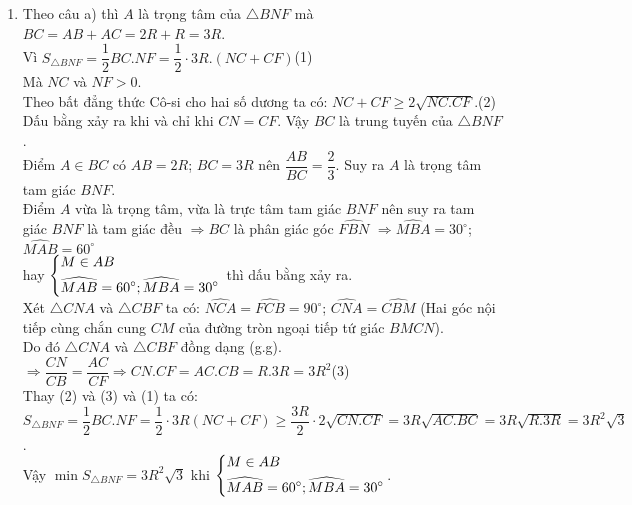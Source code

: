 \begin{vd}
{\begin{enumerate}
			\item Theo câu a) thì $A$ là trọng tâm của $\triangle BNF$ mà $BC=AB+AC=2R+R=3R$.\\
			Vì $S_{\triangle BNF}=\dfrac{1}{2}BC.NF=\dfrac{1}{2}\cdot 3R.(NC+CF)$\quad(1)\\
			Mà $NC$ và $NF>0$.\\
			Theo bất đẳng thức Cô-si cho hai số dương ta có: $NC+CF\geq 2\sqrt{NC.CF}$.\quad(2)\\
			Dấu bằng xảy ra khi và chỉ khi $CN=CF$. Vậy $BC$ là trung tuyến của $\triangle BNF$.\\
			Điểm $A\in BC$ có $AB=2R$; $BC=3R$ nên $\dfrac{AB}{BC}=\dfrac{2}{3}$. Suy ra $A$ là trọng tâm tam giác $BNF$.\\
			Điểm $A$ vừa là trọng tâm, vừa là trực tâm tam giác $BNF$ nên suy ra tam giác $BNF$ là tam giác đều
			$\Rightarrow BC$ là phân giác góc $\widehat{FBN}$ $\Rightarrow \widehat{MBA}=30^{\circ}$; $\widehat{MAB}=60^{\circ}$\\ 
			hay $\left\{\begin{aligned}&M\in AB\\&\widehat{MAB}=60^{\circ}; \widehat{MBA}=30^{\circ}\end{aligned}\right.$ thì dấu bằng xảy ra.\\
			Xét $\triangle CNA$ và $\triangle CBF$ ta có: $\widehat{NCA}=\widehat{FCB}=90^{\circ}$; $\widehat{CNA}=\widehat{CBM}$ (Hai góc nội tiếp cùng chắn cung $CM$ của đường tròn ngoại tiếp tứ giác $BMCN$).\\
			Do đó $\triangle CNA$ và $\triangle CBF$ đồng dạng (g.g).\\
			$\Rightarrow \dfrac{CN}{CB}=\dfrac{AC}{CF}\Rightarrow CN.CF=AC.CB=R.3R=3R^2$\quad(3)\\
			Thay (2) và (3) và (1) ta có:\\
			$S_{\triangle BNF}=\dfrac{1}{2}BC.NF=\dfrac{1}{2}\cdot 3R(NC+CF)\geq \dfrac{3R}{2}\cdot 2\sqrt{CN.CF}=3R\sqrt{AC.BC}=3R\sqrt{R.3R}=3R^2\sqrt{3}$.\\
			Vậy $\min S_{\triangle BNF}=3R^2\sqrt{3}$ khi $\left\{\begin{aligned}&M\in AB\\&\widehat{MAB}=60^{\circ}; \widehat{MBA}=30^{\circ}\end{aligned}\right.$.
	\end{enumerate}}
\end{vd}

